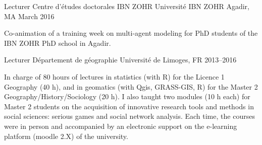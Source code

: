 \begin{cventries}
\cventry
  {Lecturer} %
  {Centre d'études doctorales IBN ZOHR} %
  {Université IBN ZOHR Agadir, MA} %
  {March 2016} %
  {
    \begin{cvitems} %
      Co-animation of a training week on multi-agent modeling for PhD students of the IBN ZOHR PhD school in Agadir.
    \end{cvitems}
  }


\cventry
  {Lecturer} %
  {Département de géographie} %
  {Université de Limoges, FR} %
  {2013--2016} %
  {
    \begin{cvitems} %
    In charge of 80 hours of lectures in statistics (with R) for the Licence 1 Geography (40 h), and in geomatics (with Qgis, GRASS-GIS, R) for the Master 2 Geography/History/Sociology (20 h). I also taught two modules (10 h each) for Master 2 students on the acquisition of innovative research tools and methods in social sciences: serious games and social network analysis. Each time, the courses were in person and accompanied by an electronic support on the e-learning platform (moodle 2.X) of the university.
    \end{cvitems}
  }


\end{cventries}
